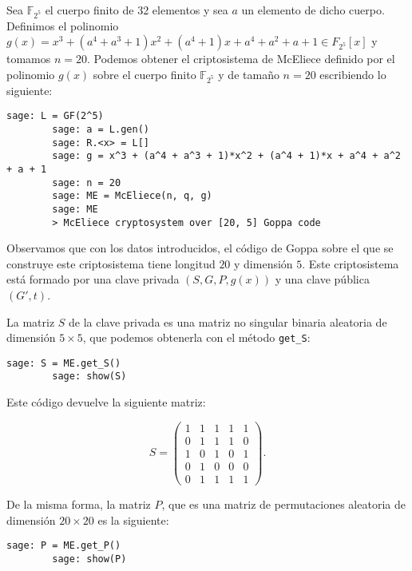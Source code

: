 \begin{exampleth}
    Sea $\mathbb{F}_{2^5}$ el cuerpo finito de 32 elementos y sea $a$ un elemento de dicho cuerpo. Definimos el polinomio $g(x) = x^3 + (a^4 + a^3 + 1) x^2 + (a^4 + 1)x + a^4 + a^2 + a + 1 \in F_{2^5}[x]$ y tomamos $n = 20$. Podemos obtener el criptosistema de McEliece definido por el polinomio $g(x)$ sobre el cuerpo finito $\mathbb{F}_{2^5}$ y de tamaño $n = 20$ escribiendo lo siguiente:

    \begin{lstlisting}[gobble=4]
        sage: L = GF(2^5)
        sage: a = L.gen()
        sage: R.<x> = L[]
        sage: g = x^3 + (a^4 + a^3 + 1)*x^2 + (a^4 + 1)*x + a^4 + a^2 + a + 1
        sage: n = 20
        sage: ME = McEliece(n, q, g)
        sage: ME
        > McEliece cryptosystem over [20, 5] Goppa code
    \end{lstlisting}

    Observamos que con los datos introducidos, el código de Goppa sobre el que se construye este criptosistema tiene longitud $20$ y dimensión $5$. Este criptosistema está formado por una clave privada $(S, G, P, g(x))$ y una clave pública $(G', t)$.

    La matriz $S$ de la clave privada es una matriz no singular binaria aleatoria de dimensión $5 \times 5$, que podemos obtenerla con el método \texttt{get\_S}:

    \begin{lstlisting}[gobble=4]
        sage: S = ME.get_S()
        sage: show(S)
    \end{lstlisting}

    Este código devuelve la siguiente matriz:

    \[
        S = \left(\begin{array}{rrrrr}
            1 & 1 & 1 & 1 & 1 \\
            0 & 1 & 1 & 1 & 0 \\
            1 & 0 & 1 & 0 & 1 \\
            0 & 1 & 0 & 0 & 0 \\
            0 & 1 & 1 & 1 & 1
            \end{array}\right).
    \]

    De la misma forma, la matriz $P$, que es una matriz de permutaciones aleatoria de dimensión $20 \times 20$ es la siguiente:

    \begin{lstlisting}[gobble=4]
        sage: P = ME.get_P()
        sage: show(P)
    \end{lstlisting}


\end{exampleth}
